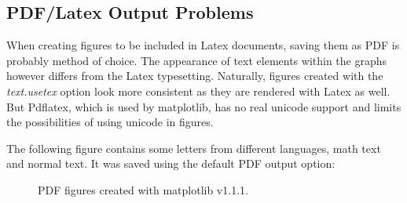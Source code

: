 \documentclass[12pt, a4paper]{article}
\begin{document}
\subsection*{PDF/Latex Output Problems}
When creating figures to be included in Latex documents, saving them as PDF is probably method of choice. The appearance of text elements within the graphs however differs from the Latex typesetting. Naturally, figures created with the \textit{text.usetex} option look more consistent as they are rendered with Latex as well. But Pdflatex, which is used by matplotlib, has no real unicode support and limits the possibilities of using unicode in figures.

The following figure contains some letters from different languages, math text and normal text. It was saved using the default PDF output option:

\begin{figure}[h]
\hspace{1mm}
\caption{PDF figures created with matplotlib v1.1.1.}
\end{figure}
\end{document}
